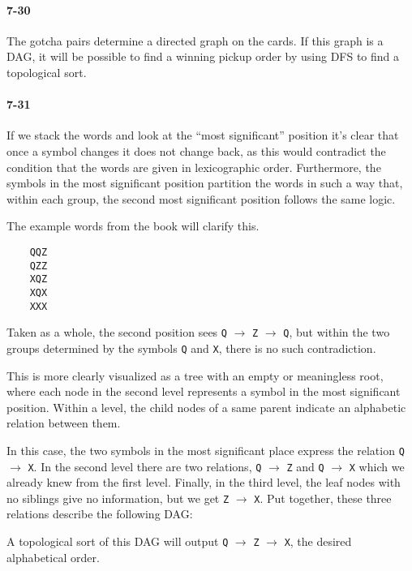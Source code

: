 \documentclass{report}
\newcommand{\li}{\lstinline}
\begin{document}
\paragraph{7-30} The gotcha pairs determine a directed graph on the cards. If this graph is a DAG, it will be possible to find a winning pickup order by using DFS to find a topological sort.

\paragraph{7-31} If we stack the words and look at the ``most significant'' position it's clear that once a symbol changes it does not change back, as this would contradict the condition that the words are given in lexicographic order. Furthermore, the symbols in the most significant position partition the words in such a way that, within each group, the second most significant position follows the same logic.

The example words from the book will clarify this.
\begin{lstlisting}
	QQZ
	QZZ
	XQZ
	XQX
	XXX
\end{lstlisting}
Taken as a whole, the second position sees \li!Q! $\to$ \li!Z! $\to$ \li!Q!, but within the two groups determined by the symbols \li!Q! and \li!X!, there is no such contradiction.

This is more clearly visualized as a tree with an empty or meaningless root, where each node in the second level represents a symbol in the most significant position. Within a level, the child nodes of a same parent indicate an alphabetic relation between them.
\begin{center}
\end{center}
In this case, the two symbols in the most significant place express the relation \li!Q! $\to$ \li!X!. In the second level there are two relations, \li!Q! $\to$ \li!Z! and \li!Q! $\to$ \li!X! which we already knew from the first level. Finally, in the third level, the leaf nodes with no siblings give no information, but we get \li!Z! $\to$ \li!X!. Put together, these three relations describe the following DAG:
\begin{center}
\end{center}
A topological sort of this DAG will output \li!Q! $\to$ \li!Z! $\to$ \li!X!, the desired alphabetical order.
\end{document}
